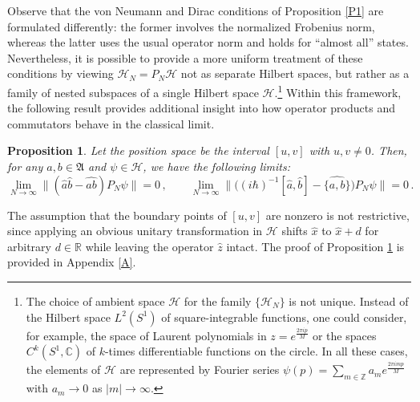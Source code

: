 \documentclass[12pt,a4paper]{article}
\numberwithin{equation}{section}
\theoremstyle{theorem}
\newtheorem{proposition}[]{Proposition}
\theoremstyle{remark}
\newcommand{\hh}{\mathcal{H}}
\newcommand{\fa}{\mathfrak{A}}
\begin{document}
Observe that the von Neumann and Dirac conditions of Proposition \ref{P1} are formulated differently: the former involves the normalized Frobenius norm, whereas the latter uses the usual operator norm and holds for ``almost all'' states. Nevertheless, it is possible to provide a more uniform treatment of these conditions by viewing $\hh_N=P_N\hh$ not as separate Hilbert spaces, but rather as a family of nested subspaces of a single Hilbert space $\hh$.\footnote{The choice of ambient space $\hh$ for the family $\{\hh_N\}$ is not unique. Instead of the Hilbert space $L^2(S^1)$ of square-integrable functions, one could 
consider, for example, the space of Laurent polynomials in $z=e^{\frac{2\pi i p}{M}}$ or the spaces  $C^k(S^1, \mathbb{C})$ of $k$-times differentiable functions on the circle. In all these cases, the elements of $\hh$ are represented by Fourier series 
$
\psi(p)=\sum_{m\in \mathbb{Z}}a_me^{\frac{2\pi imp}{M}}
$
with $a_m\rightarrow 0$ as $|m|\rightarrow \infty$. } 
Within this framework, the following result provides additional insight into how operator products and commutators behave in the classical limit.
\begin{proposition}\label{P2} Let the position space be the interval $[u,v]$ with $u, v\neq 0$. Then,
    for any $a,b\in \fa$ and $\psi \in\hh $, we have the following limits:
    \begin{equation}
        \lim_{N\to\infty}\big\|(\hat{a}\hat{b}-\widehat{ab})P_N\psi \big\|=0\,,\qquad   \lim_{N\to \infty}\big\|\big({(i\hbar)^{-1}}[\hat{a},\hat{b}]-\widehat{\{a,b\}}\big)P_N\psi \big\|=0\,.
        \end{equation}
\end{proposition}
The assumption that the boundary points of $ [u,v]$ are nonzero is not restrictive, since applying an obvious unitary transformation in $\hh$ shifts $\hat x$ to $\hat{x}+d$ for arbitrary $d\in \mathbb{R}$ while leaving the operator $\hat{z}$ intact. The proof of Proposition \ref{P2} is provided in Appendix \ref{A}. 
\end{document}
